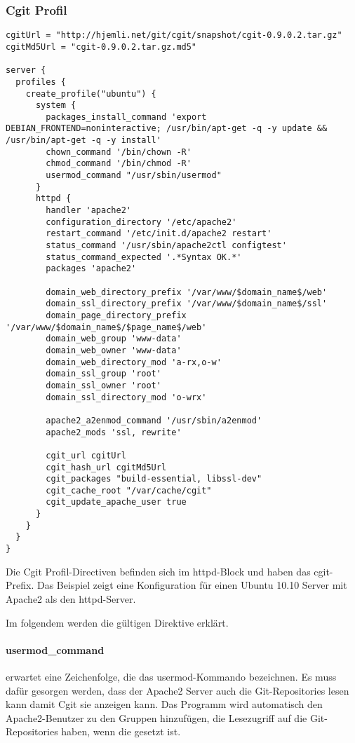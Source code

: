 \subsubsection{Cgit Profil}

\begin{lstlisting}[style=Java, caption=Beispiel Cgit Profil]
cgitUrl = "http://hjemli.net/git/cgit/snapshot/cgit-0.9.0.2.tar.gz"
cgitMd5Url = "cgit-0.9.0.2.tar.gz.md5"

server {
  profiles {
    create_profile("ubuntu") {
      system {
        packages_install_command 'export DEBIAN_FRONTEND=noninteractive; /usr/bin/apt-get -q -y update && /usr/bin/apt-get -q -y install'
        chown_command '/bin/chown -R'
        chmod_command '/bin/chmod -R'
        usermod_command "/usr/sbin/usermod"
      }
      httpd {
        handler 'apache2'
        configuration_directory '/etc/apache2'
        restart_command '/etc/init.d/apache2 restart'
        status_command '/usr/sbin/apache2ctl configtest'
        status_command_expected '.*Syntax OK.*'
        packages 'apache2'

        domain_web_directory_prefix '/var/www/$domain_name$/web'
        domain_ssl_directory_prefix '/var/www/$domain_name$/ssl'
        domain_page_directory_prefix '/var/www/$domain_name$/$page_name$/web'
        domain_web_group 'www-data'
        domain_web_owner 'www-data'
        domain_web_directory_mod 'a-rx,o-w'
        domain_ssl_group 'root'
        domain_ssl_owner 'root'
        domain_ssl_directory_mod 'o-wrx'

        apache2_a2enmod_command '/usr/sbin/a2enmod'
        apache2_mods 'ssl, rewrite'

        cgit_url cgitUrl
        cgit_hash_url cgitMd5Url
        cgit_packages "build-essential, libssl-dev"
        cgit_cache_root "/var/cache/cgit"
        cgit_update_apache_user true
      }
    }
  }
}
\end{lstlisting}

Die Cgit Profil-Directiven befinden sich im httpd-Block und haben das
cgit-Prefix. Das Beispiel zeigt eine Konfiguration für einen Ubuntu 10.10 Server
mit Apache2 als den httpd-Server.

Im folgendem werden die gültigen Direktive erklärt.

\paragraph{usermod\_command}

 erwartet eine Zeichenfolge, die das
usermod-Kommando bezeichnen. Es muss dafür gesorgen werden, dass der Apache2
Server auch die Git-Repositories lesen kann damit Cgit sie anzeigen kann. Das
Programm wird automatisch den Apache2-Benutzer zu den Gruppen hinzufügen, die
Lesezugriff auf die Git-Repositories haben, wenn die
 gesetzt ist.

